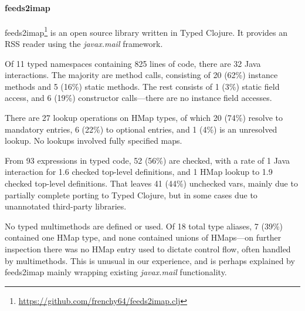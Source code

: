 \documentclass[9pt]{extarticle}
\begin{document}
\paragraph{feeds2imap}
feeds2imap\footnote{\url{https://github.com/frenchy64/feeds2imap.clj}}
is an open source library written in Typed Clojure. 
It provides an RSS reader using the \emph{javax.mail} framework.

Of 11 typed namespaces containing 825 lines of code, there are 32 Java interactions.
The majority are method calls, consisting of 20 (62\%) instance methods and 5 (16\%) static methods. 
The rest consists of 1 (3\%) static field access, and 6 (19\%) constructor calls---there are no instance field accesses.

There are 27 lookup operations on HMap types, of which 20 (74\%) resolve to mandatory entries, 6 (22\%) to optional entries, and 1 (4\%) is an unresolved lookup. 
No lookups involved fully specified maps.

From 93  expressions in typed code, 52 (56\%) are checked, with a rate of 1 Java interaction for 1.6 checked top-level definitions, and 1 HMap lookup to 1.9 checked top-level definitions.
That leaves 41 (44\%) unchecked vars, mainly due to partially complete porting to Typed Clojure, but in some cases due to unannotated third-party libraries.

No typed multimethods are defined or used. 
Of 18 total type aliases, 7 (39\%) contained one HMap type, and none contained unions of HMaps---on further inspection there was no HMap entry used to dictate control flow, often handled by multimethods.
This is unusual in our experience, and is perhaps explained by feeds2imap mainly wrapping existing \emph{javax.mail} functionality.
\end{document}
